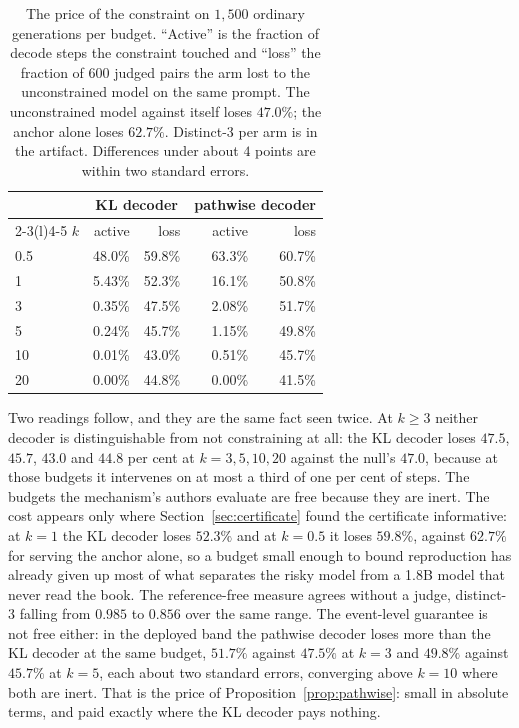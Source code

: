 \begin{table}[t]
\centering
\caption{The price of the constraint on $1{,}500$ ordinary generations per budget. ``Active'' is the fraction of decode steps the constraint touched and ``loss'' the fraction of $600$ judged pairs the arm lost to the unconstrained model on the same prompt. The unconstrained model against itself loses $47.0\%$; the anchor alone loses $62.7\%$. Distinct-3 per arm is in the artifact. Differences under about $4$ points are within two standard errors.}
\label{tab:utility}
\small
\setlength{\tabcolsep}{3.4pt}
\begin{tabular}{@{}lrrrr@{}}
\toprule
& \multicolumn{2}{c}{KL decoder} & \multicolumn{2}{c}{pathwise decoder} \\
\cmidrule(lr){2-3}\cmidrule(l){4-5}
$k$ & active & loss & active & loss \\
\midrule
0.5 & 48.0\% & 59.8\% & 63.3\% & 60.7\% \\
1 & 5.43\% & 52.3\% & 16.1\% & 50.8\% \\
3 & 0.35\% & 47.5\% & 2.08\% & 51.7\% \\
5 & 0.24\% & 45.7\% & 1.15\% & 49.8\% \\
10 & 0.01\% & 43.0\% & 0.51\% & 45.7\% \\
20 & 0.00\% & 44.8\% & 0.00\% & 41.5\% \\
\bottomrule
\end{tabular}
\end{table}

Two readings follow, and they are the same fact seen twice. At $k \ge 3$ neither decoder is distinguishable from not constraining at all: the KL decoder loses $47.5$, $45.7$, $43.0$ and $44.8$ per cent at $k = 3, 5, 10, 20$ against the null's $47.0$, because at those budgets it intervenes on at most a third of one per cent of steps. The budgets the mechanism's authors evaluate are free because they are inert. The cost appears only where Section~\ref{sec:certificate} found the certificate informative: at $k=1$ the KL decoder loses $52.3\%$ and at $k=0.5$ it loses $59.8\%$, against $62.7\%$ for serving the anchor alone, so a budget small enough to bound reproduction has already given up most of what separates the risky model from a 1.8B model that never read the book. The reference-free measure agrees without a judge, distinct-3 falling from $0.985$ to $0.856$ over the same range. The event-level guarantee is not free either: in the deployed band the pathwise decoder loses more than the KL decoder at the same budget, $51.7\%$ against $47.5\%$ at $k=3$ and $49.8\%$ against $45.7\%$ at $k=5$, each about two standard errors, converging above $k=10$ where both are inert. That is the price of Proposition~\ref{prop:pathwise}: small in absolute terms, and paid exactly where the KL decoder pays nothing.

